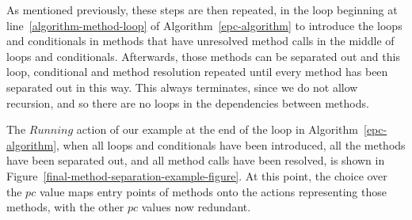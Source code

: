 As mentioned previously, these steps are then repeated, in the loop
beginning at line~\ref{algorithm-method-loop} of
Algorithm~\ref{epc-algorithm} to introduce the loops and conditionals
in methods that have unresolved method calls in the middle of loops
and conditionals.
Afterwards, those methods can be separated out and this loop,
conditional and method resolution repeated until every method has been
separated out in this way.
This always terminates, since we do not allow recursion, and so there
are no loops in the dependencies between methods.

The $Running$ action of our example at the end of the loop in
Algorithm~\ref{epc-algorithm}, when all loops and conditionals have
been introduced, all the methods have been separated out, and all
method calls have been resolved, is shown in
Figure~\ref{final-method-separation-example-figure}.
At this point, the choice over the $pc$ value maps entry points of
methods onto the actions representing those methods, with the other
$pc$ values now redundant.

